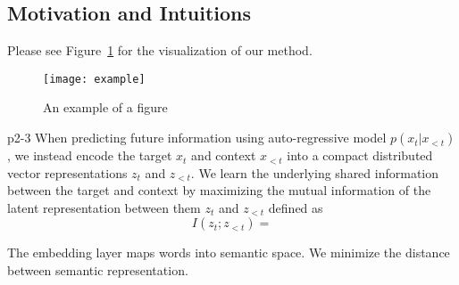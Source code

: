 \documentclass[a4paper]{article}
\theoremstyle{plain}
\theoremstyle{definition}
\begin{document}
	\subsection{Motivation and Intuitions}
	Please see Figure~\ref{fig:example} for the visualization of our method.
	\begin{figure}[ht]
		\centering
		\texttt{[image: example]}
		\caption{An example of a figure}
		\label{fig:example}
	\end{figure}

	\cite{van2018representation}p2-3
	When predicting future information using auto-regressive model $p(x_t|x_{<t})$, we instead encode the target $x_t$ and context $x_{<t}$ into a compact distributed vector representations $z_t$ and $z_{<t}$.
	We learn the underlying shared information between the target and context by maximizing the mutual information of the latent representation between them $z_t$ and $z_{<t}$ defined as
	\begin{equation}
		I(z_t; z_{<t}) = 
	\end{equation}

	The embedding layer maps words into semantic space. We minimize the distance between semantic representation.


	
		
\end{document}
